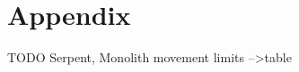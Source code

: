 

\chapter*{Appendix}
\label{ch:Appendix}

\huge{TODO}
Serpent, Monolith movement limits --\textgreater table
\normalsize{}

\clearpage %
